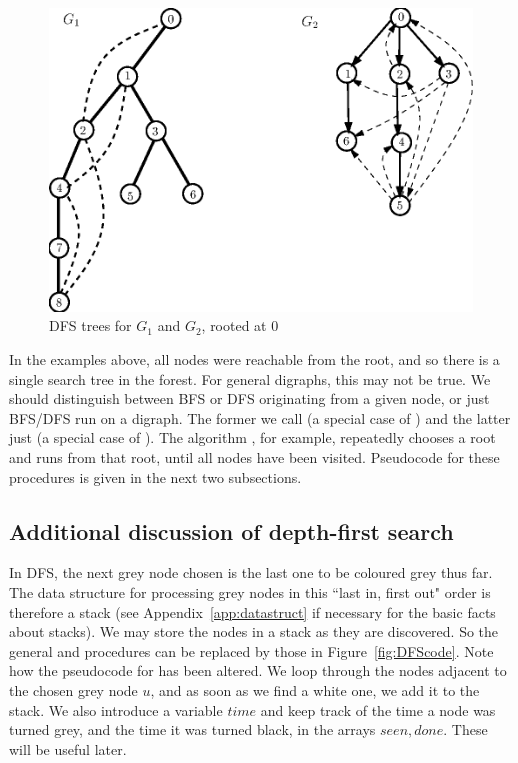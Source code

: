 
\begin{figure}[hbtp]
\label{fig:graphEx2-DFS}

\medskip

\centerline{\includegraphics{./figs/graphEx2DFS.eps}}

\caption{DFS trees for $G_1$ and $G_2$, rooted at $0$}

\end{figure}

In the examples above, all nodes were reachable from the root, and so
there is a single search tree in the forest. For general digraphs, this
may not be true. We should distinguish between BFS or DFS originating
from a given node, or just BFS/DFS run on a digraph. The former we call
 (a special case of ) and the
latter just  (a special case of ). The
algorithm , for example, repeatedly chooses a root and runs
 from that root, until all nodes have been visited.
Pseudocode for these procedures is given in the next two subsections.

\subsection{Additional discussion of depth-first search}
\label{ss: DFS}

In DFS, the next grey node chosen is the last one to be coloured grey thus far. The data structure for processing grey nodes  in this ``last in, first
out" order is therefore a stack (see Appendix~\ref{app:datastruct} if
necessary for the basic facts about stacks). We may store the nodes in a
stack as they are discovered. So the general  and
 procedures can be replaced by those in
Figure~\ref{fig:DFScode}. Note how the pseudocode for  has
been altered. We loop through the nodes adjacent to the chosen grey node
$u$, and as soon as we find a white one, we add it to the stack. We also
introduce a variable $time$ and keep track of the time a node was turned
grey, and the time it was turned black, in the arrays $seen, done$.
These will be useful later.

